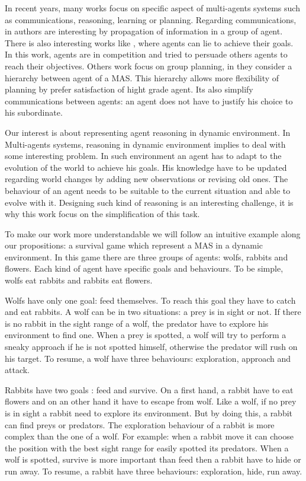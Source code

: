 \documentclass{aamas2012}
\begin{document}
	In recent years, many works focus on specific aspect of multi-agents systems such as communications, reasoning, learning or planning.
	Regarding communications, in \cite{DBLP:conf/ecai/BourgneIM10, DBLP:conf/lads/BourgneIM10} authors are interesting 
	by propagation of information in a group of agent.
	There is also interesting works like \cite{DBLP:conf/ijcai/SakamaSP11}, where agents can lie to achieve their goals.
	In this work, agents are in competition and tried to persuade others agents to reach their objectives.
	Others work focus on group planning, in \cite{DBLP:conf/clima/NieuwenborghVHV06} they consider a hierarchy between agent of a MAS.
	This hierarchy allows more flexibility of planning by prefer satisfaction of hight grade agent.
	Its also simplify communications between agents: an agent does not have to justify his choice to his subordinate.
	
	Our interest is about representing agent reasoning in dynamic environment.
	In Multi-agents systems, reasoning in dynamic environment implies to deal with some interesting problem.
	In such environment an agent has to adapt to the evolution of the world to achieve his goals.
	His knowledge have to be updated regarding world changes by adding new observations or revising old ones.
	The behaviour of an agent needs to be suitable to the current situation and able to evolve with it.
	Designing such kind of reasoning is an interesting challenge, it is why this work focus on the simplification of this task.
	
	To make our work more understandable we will follow an intuitive example along our propositions: a survival game which represent a MAS in a dynamic environment.
	In this game there are three groups of agents: wolfs, rabbits and flowers.
	Each kind of agent have specific goals and behaviours.
	To be simple, wolfs eat rabbits and rabbits eat flowers.
	
	Wolfs have only one goal: feed themselves.
	To reach this goal they have to catch and eat rabbits.
	A wolf can be in two situations: a prey is in sight or not.
	If there is no rabbit in the sight range of a wolf, the predator have to explore his environment to find one.
	When a prey is spotted, a wolf will try to perform a sneaky approach if he is not spotted himself, otherwise the predator will rush on his target.
	To resume, a wolf have three behaviours: exploration, approach and attack.
	
	Rabbits have two goals : feed and survive.
	On a first hand, a rabbit have to eat flowers and on an other hand it have to escape from wolf.
	Like a wolf, if no prey is in sight a rabbit need to explore its environment.
	But by doing this, a rabbit can find preys or predators.
	The exploration behaviour of a rabbit is more complex than the one of a wolf.
	For example: when a rabbit move it can choose the position with the best sight range for easily spotted its predators.
	When a wolf is spotted, survive is more important than feed then a rabbit have to hide or run away.
	To resume, a rabbit have three behaviours: exploration, hide, run away.
	
\end{document}
